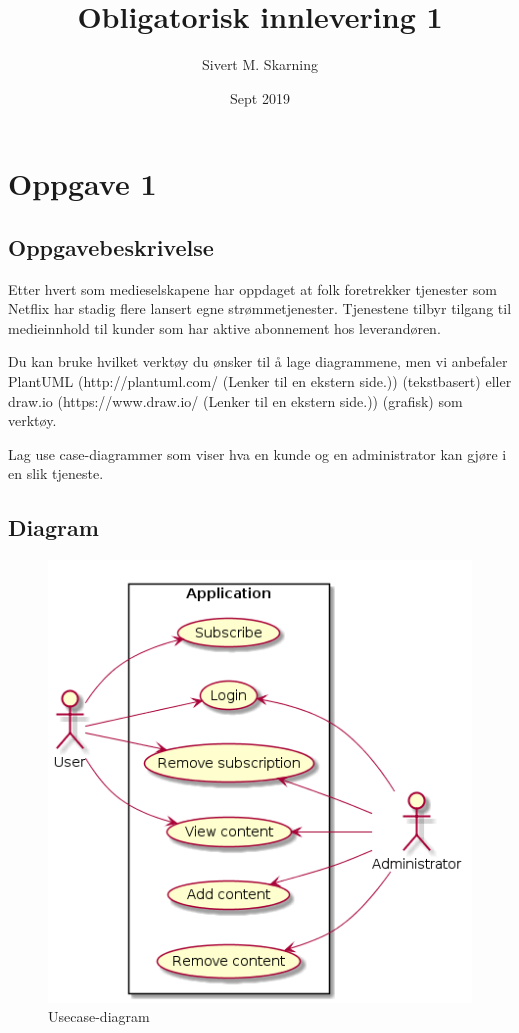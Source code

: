 \documentclass{article}
\title{Obligatorisk innlevering 1}
\author{Sivert M. Skarning}
\date{Sept 2019}
\begin{document}
\maketitle
\clearpage
\tableofcontents
\clearpage
\section{Oppgave 1}
\subsection{Oppgavebeskrivelse}
Etter hvert som medieselskapene har oppdaget at folk foretrekker tjenester som Netflix har stadig flere lansert egne strømmetjenester. Tjenestene tilbyr tilgang til medieinnhold til kunder som har aktive abonnement hos leverandøren. 

Du kan bruke hvilket verktøy du ønsker til å lage diagrammene, men vi anbefaler PlantUML (http://plantuml.com/ (Lenker til en ekstern side.)) (tekstbasert) eller draw.io (https://www.draw.io/ (Lenker til en ekstern side.)) (grafisk) som verktøy.

Lag use case-diagrammer som viser hva en kunde og en administrator kan gjøre i en slik tjeneste.
\subsection{Diagram}
\begin{figure}[h]
\centering
\includegraphics[scale=0.5]{images/oppgave1.png}
\caption{Usecase-diagram}
\label{fig:oppgave1.png}
\end{figure}
\end{document}
